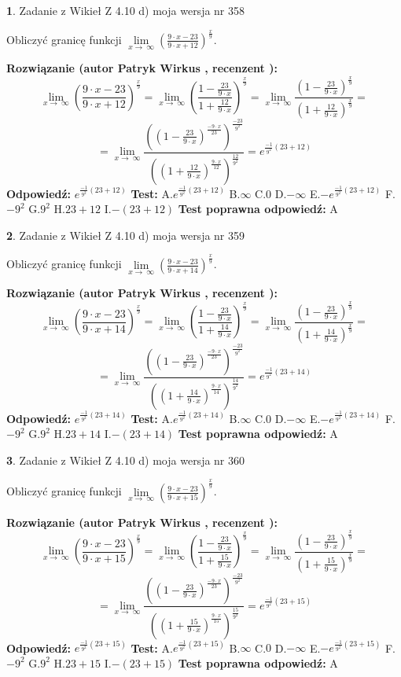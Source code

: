 \documentclass[12pt, a4paper]{article}
\theoremstyle{definition} %
\newtheorem{zad}{}
\newcommand{\zadStart}[1]{\begin{zad}#1\newline}
\newcommand{\zadStop}{\end{zad}}
\newcommand{\rozwStart}[2]{\noindent \textbf{Rozwiązanie (autor #1 , recenzent #2): }\newline}
\newcommand{\rozwStop}{\newline}
\newcommand{\odpStart}{\noindent \textbf{Odpowiedź:}\newline}
\newcommand{\odpStop}{\newline}
\newcommand{\testStart}{\noindent \textbf{Test:}\newline}
\newcommand{\testStop}{\newline}
\newcommand{\kluczStart}{\noindent \textbf{Test poprawna odpowiedź:}\newline}
\newcommand{\kluczStop}{\newline}
\begin{document}
\zadStart{Zadanie z Wikieł Z 4.10 d) moja wersja nr 358}


Obliczyć granicę funkcji  $\lim\limits_{x\to\ \infty}(\frac{9\cdot x-23}{9\cdot x+12})^{\frac{x}{9}}$.
\zadStop
\rozwStart{Patryk Wirkus}{}
$$\lim\limits_{x\to\ \infty}(\frac{9\cdot x-23}{9\cdot x+12})^{\frac{x}{9}} = \lim\limits_{x\to\ \infty}(\frac{1-\frac{23}{9\cdot x}}{1+\frac{12}{9\cdot x}})^{\frac{x}{9}}=\lim\limits_{x\to\ \infty}\frac{(1-\frac{23}{9\cdot x})^{\frac{x}{9}}}{(1+\frac{12}{9\cdot x})^{\frac{x}{9}}}=$$
$$=\lim\limits_{x\to\ \infty}\frac{((1-\frac{23}{9\cdot x})^{\frac{-9\cdot x}{23}})^{\frac{-23}{9^{2}}}}{((1+\frac{12}{9\cdot x})^{\frac{9\cdot x}{12}})^{\frac{12}{9^{2}}}}=e^{\frac{-1}{9^{2}}(23+12)}$$
\rozwStop
\odpStart
$e^{\frac{-1}{9^{2}}(23+12)}$
\odpStop
\testStart
A.$e^{\frac{-1}{9^{2}}(23+12)}$ B.$\infty$ C.$0$ D.$-\infty$ E.$-e^{\frac{-1}{9^{2}}(23+12)}$
F.$-9^{2}$ G.$9^{2}$
H.$23+12$
I.$-(23+12)$
\testStop
\kluczStart
A
\kluczStop



\zadStart{Zadanie z Wikieł Z 4.10 d) moja wersja nr 359}


Obliczyć granicę funkcji  $\lim\limits_{x\to\ \infty}(\frac{9\cdot x-23}{9\cdot x+14})^{\frac{x}{9}}$.
\zadStop
\rozwStart{Patryk Wirkus}{}
$$\lim\limits_{x\to\ \infty}(\frac{9\cdot x-23}{9\cdot x+14})^{\frac{x}{9}} = \lim\limits_{x\to\ \infty}(\frac{1-\frac{23}{9\cdot x}}{1+\frac{14}{9\cdot x}})^{\frac{x}{9}}=\lim\limits_{x\to\ \infty}\frac{(1-\frac{23}{9\cdot x})^{\frac{x}{9}}}{(1+\frac{14}{9\cdot x})^{\frac{x}{9}}}=$$
$$=\lim\limits_{x\to\ \infty}\frac{((1-\frac{23}{9\cdot x})^{\frac{-9\cdot x}{23}})^{\frac{-23}{9^{2}}}}{((1+\frac{14}{9\cdot x})^{\frac{9\cdot x}{14}})^{\frac{14}{9^{2}}}}=e^{\frac{-1}{9^{2}}(23+14)}$$
\rozwStop
\odpStart
$e^{\frac{-1}{9^{2}}(23+14)}$
\odpStop
\testStart
A.$e^{\frac{-1}{9^{2}}(23+14)}$ B.$\infty$ C.$0$ D.$-\infty$ E.$-e^{\frac{-1}{9^{2}}(23+14)}$
F.$-9^{2}$ G.$9^{2}$
H.$23+14$
I.$-(23+14)$
\testStop
\kluczStart
A
\kluczStop



\zadStart{Zadanie z Wikieł Z 4.10 d) moja wersja nr 360}


Obliczyć granicę funkcji  $\lim\limits_{x\to\ \infty}(\frac{9\cdot x-23}{9\cdot x+15})^{\frac{x}{9}}$.
\zadStop
\rozwStart{Patryk Wirkus}{}
$$\lim\limits_{x\to\ \infty}(\frac{9\cdot x-23}{9\cdot x+15})^{\frac{x}{9}} = \lim\limits_{x\to\ \infty}(\frac{1-\frac{23}{9\cdot x}}{1+\frac{15}{9\cdot x}})^{\frac{x}{9}}=\lim\limits_{x\to\ \infty}\frac{(1-\frac{23}{9\cdot x})^{\frac{x}{9}}}{(1+\frac{15}{9\cdot x})^{\frac{x}{9}}}=$$
$$=\lim\limits_{x\to\ \infty}\frac{((1-\frac{23}{9\cdot x})^{\frac{-9\cdot x}{23}})^{\frac{-23}{9^{2}}}}{((1+\frac{15}{9\cdot x})^{\frac{9\cdot x}{15}})^{\frac{15}{9^{2}}}}=e^{\frac{-1}{9^{2}}(23+15)}$$
\rozwStop
\odpStart
$e^{\frac{-1}{9^{2}}(23+15)}$
\odpStop
\testStart
A.$e^{\frac{-1}{9^{2}}(23+15)}$ B.$\infty$ C.$0$ D.$-\infty$ E.$-e^{\frac{-1}{9^{2}}(23+15)}$
F.$-9^{2}$ G.$9^{2}$
H.$23+15$
I.$-(23+15)$
\testStop
\kluczStart
A
\kluczStop
\end{document}
